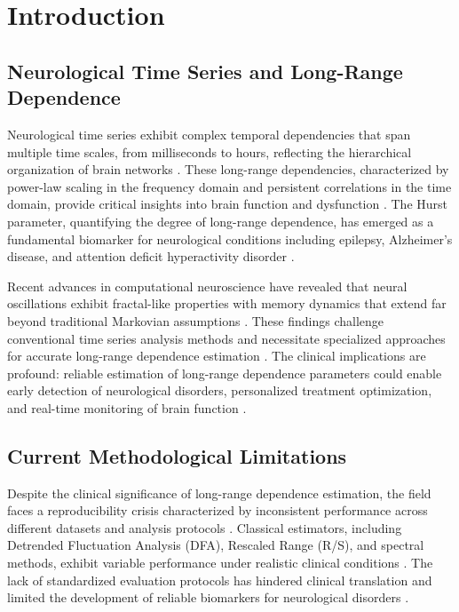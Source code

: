 \section{Introduction}

\subsection{Neurological Time Series and Long-Range Dependence}

Neurological time series exhibit complex temporal dependencies that span multiple time scales, from milliseconds to hours, reflecting the hierarchical organization of brain networks \citep{VanDenHeuvel2010}. These long-range dependencies, characterized by power-law scaling in the frequency domain and persistent correlations in the time domain, provide critical insights into brain function and dysfunction \citep{Fornito2016}. The Hurst parameter, quantifying the degree of long-range dependence, has emerged as a fundamental biomarker for neurological conditions including epilepsy, Alzheimer's disease, and attention deficit hyperactivity disorder \citep{Mill2017}.

Recent advances in computational neuroscience have revealed that neural oscillations exhibit fractal-like properties with memory dynamics that extend far beyond traditional Markovian assumptions \citep{Marasco2012}. These findings challenge conventional time series analysis methods and necessitate specialized approaches for accurate long-range dependence estimation \citep{Bouteiller2011}. The clinical implications are profound: reliable estimation of long-range dependence parameters could enable early detection of neurological disorders, personalized treatment optimization, and real-time monitoring of brain function \citep{Lytton2017}.

\subsection{Current Methodological Limitations}

Despite the clinical significance of long-range dependence estimation, the field faces a reproducibility crisis characterized by inconsistent performance across different datasets and analysis protocols \citep{Harris2020}. Classical estimators, including Detrended Fluctuation Analysis (DFA), Rescaled Range (R/S), and spectral methods, exhibit variable performance under realistic clinical conditions \citep{Virtanen2020}. The lack of standardized evaluation protocols has hindered clinical translation and limited the development of reliable biomarkers for neurological disorders \citep{McKinney2010}.

